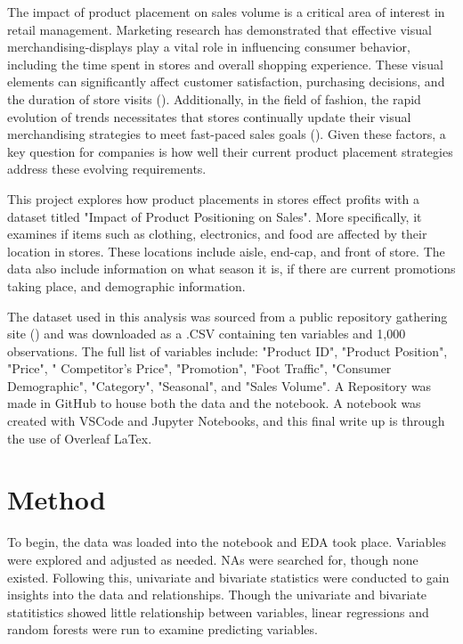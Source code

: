 \documentclass[stu,12pt,floatsintext]{apa7}
\begin{document}
The impact of product placement on sales volume is a critical area of interest in retail management. Marketing research has demonstrated that effective visual merchandising-displays play a vital role in influencing consumer behavior, including the time spent in stores and overall shopping experience. These visual elements can significantly affect customer satisfaction, purchasing decisions, and the duration of store visits (\cite{basu:2022}). Additionally, in the field of fashion, the rapid evolution of trends necessitates that stores continually update their visual merchandising strategies to meet fast-paced sales goals (\cite{Akhilendra:2023}). Given these factors, a key question for companies is how well their current product placement strategies address these evolving requirements.

This project explores how product placements in stores effect profits with a dataset titled "Impact of Product Positioning on Sales". More specifically, it examines if items such as clothing, electronics, and food are affected by their location in stores. These locations include aisle, end-cap, and front of store. The data also include information on what season it is, if there are current promotions taking place, and demographic information. 

The dataset used in this analysis was sourced from a public repository gathering site (\cite{kaggle:2024}) and was downloaded as a .CSV containing ten variables and 1,000 observations. The full list of variables include: "Product ID", "Product Position", "Price", " Competitor's Price", "Promotion", "Foot Traffic", "Consumer Demographic", "Category", "Seasonal", and "Sales Volume". A Repository was made in GitHub to house both the data and the notebook. A notebook was created with VSCode and Jupyter Notebooks, and this final write up is through the use of Overleaf LaTex. 

\section{Method}

To begin, the data was loaded into the notebook and EDA took place. Variables were explored and adjusted as needed. NAs were searched for, though none existed. Following this, univariate and bivariate statistics were conducted to gain insights into the data and relationships. Though the univariate and bivariate statitistics showed little relationship between variables, linear regressions and random forests were run to examine predicting variables. 
\end{document}
